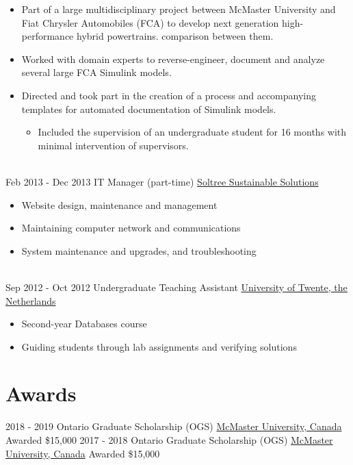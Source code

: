 \documentclass[letterpaper]{twentysecondcv} %
\begin{document}
\begin{twenty}
{\begin{itemize}
			\item Part of a large multidisciplinary project
			between McMaster University and Fiat Chrysler Automobiles (FCA) to develop
			next generation high-performance hybrid powertrains.
			comparison between them.
			\item Worked with domain experts to reverse-engineer, document and analyze
			several large FCA Simulink models.
			\item Directed and took part in the creation of a process and accompanying
			templates for automated documentation of Simulink models. 
      \begin{itemize}
        \item Included the supervision of an undergraduate student for 16 months with minimal intervention of supervisors.
      \end{itemize}
	\end{itemize}}
	\\
	\twentyitem
	{Feb 2013 -}
	{Dec 2013}
	{IT Manager (part-time)}
	{\href{http://www.soltree.net/}{Soltree Sustainable Solutions}}
	{}
	{\begin{itemize}
			\item Website design, maintenance and management
			\item Maintaining computer network and communications
			\item System maintenance and upgrades, and troubleshooting
	\end{itemize}}
	\\
	\twentyitem
	{Sep 2012 -}
	{Oct 2012}
	{Undergraduate Teaching Assistant}
	{\href{https://www.utwente.nl/}{University of Twente, the Netherlands}}
	{}
	{\begin{itemize}
			\item Second-year Databases course
			\item Guiding students through lab assignments and verifying solutions
	\end{itemize}}
	
\end{twenty} 
\vspace{-.5em}
\section{Awards}

\vspace{-.5em}
\begin{twenty}
  \twentyitem
  {2018 -}
  {2019}
  {Ontario Graduate Scholarship (OGS)}
  {\href{https://www.mcmaster.ca/}{McMaster University, Canada}}
  {}
  {Awarded \$15,000}
\twentyitem
	{2017 -}
	{2018}
	{Ontario Graduate Scholarship (OGS)}
	{\href{https://www.mcmaster.ca/}{McMaster University, Canada}}
	{}
	{Awarded \$15,000}
\end{twenty}
\end{document}

